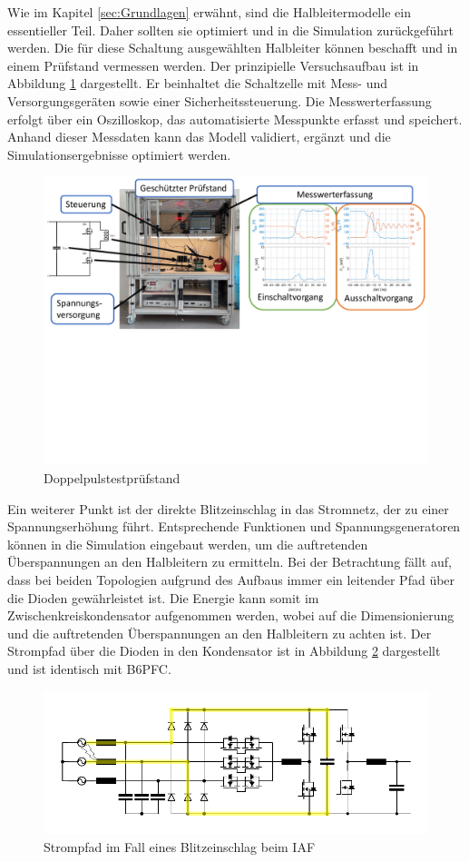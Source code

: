 Wie im Kapitel \ref{sec:Grundlagen} erwähnt, sind die Halbleitermodelle ein essentieller Teil. Daher sollten sie optimiert und in die Simulation zurückgeführt werden. Die für diese Schaltung ausgewählten Halbleiter können beschafft und in einem Prüfstand vermessen werden. Der prinzipielle Versuchsaufbau ist in Abbildung \ref{fig:dpt} dargestellt. Er beinhaltet die Schaltzelle mit Mess- und Versorgungsgeräten sowie einer Sicherheitssteuerung. Die Messwerterfassung erfolgt über ein Oszilloskop, das automatisierte Messpunkte erfasst und speichert.  Anhand dieser Messdaten kann das Modell validiert, ergänzt und die Simulationsergebnisse optimiert werden. \\
\begin{figure}
	\centering
	\includegraphics[width=0.95\linewidth]{content/Grafiken/DPT}
	\caption[Doppelpulstestprüfstand]{Doppelpulstestprüfstand}
	\label{fig:dpt}
\end{figure}
Ein weiterer Punkt ist der direkte Blitzeinschlag in das Stromnetz, der zu einer Spannungserhöhung führt. Entsprechende Funktionen und Spannungsgeneratoren können in die Simulation eingebaut werden, um die auftretenden Überspannungen an den Halbleitern zu ermitteln. Bei der Betrachtung fällt auf, dass bei beiden Topologien aufgrund des Aufbaus immer ein leitender Pfad über die Dioden gewährleistet ist. Die Energie kann somit im Zwischenkreiskondensator aufgenommen werden, wobei auf die Dimensionierung und die auftretenden Überspannungen an den Halbleitern zu achten ist. Der Strompfad über die Dioden in den Kondensator ist in Abbildung \ref{fig:iafsurge} dargestellt und ist identisch mit \gls{B6PFC}. \\
\begin{figure} [H]
	\centering
	\includegraphics[width=0.95\linewidth]{content/Grafiken/IAF_surge}
	\caption{Strompfad im Fall eines Blitzeinschlag beim IAF}
	\label{fig:iafsurge}
\end{figure}

